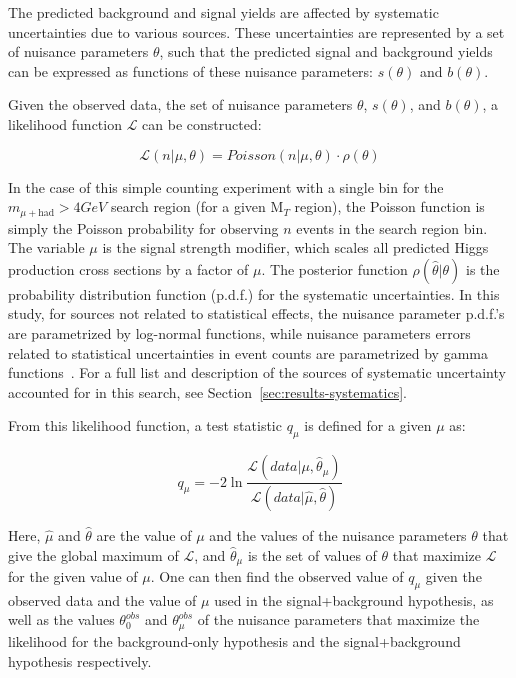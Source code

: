The predicted background and signal yields are affected by systematic uncertainties due to various sources. These uncertainties are represented by a set of nuisance parameters $\theta$, such that the predicted signal and background yields can be expressed as functions of these nuisance parameters: $s(\theta)$ and $b(\theta)$.

Given the observed data, the set of nuisance parameters $\theta$, $s(\theta)$, and $b(\theta)$, a likelihood function $\mathcal{L}$ can be constructed:

\begin{equation}
\mathcal{L}(n \vert \mu,\theta) = Poisson(n \vert \mu,\theta) \cdot \rho(\theta)
\label{eq:likelihood}
\end{equation}

In the case of this simple counting experiment with a single bin for the $m_{\mu+\text{had}} > 4 GeV$ search region (for a given M$_T$ region), the Poisson function is simply the Poisson probability for observing $n$ events in the search region bin. The variable $\mu$ is the signal strength modifier, which scales all predicted Higgs production cross sections by a factor of $\mu$. The posterior function $\rho(\hat{\theta} \vert \theta)$ is the probability distribution function (p.d.f.) for the systematic uncertainties. In this study, for sources not related to statistical effects, the nuisance parameter p.d.f.'s are parametrized by log-normal functions, while nuisance parameters errors related to statistical uncertainties in event counts are parametrized by gamma functions~\cite{CombinedTwiki}. For a full list and description of the sources of systematic uncertainty accounted for in this search, see Section~\ref{sec:results-systematics}.

From this likelihood function, a test statistic $q_{\mu}$ is defined for a given $\mu$ as:

\begin{equation}
q_{\mu} = -2\ln\frac{\mathcal{L}(data \vert \mu,\hat{\theta}_{\mu})}{\mathcal{L}(data \vert \hat{\mu},\hat{\theta})}
\label{eq:test-statistic}
\end{equation}

Here, $\hat{\mu}$ and $\hat{\theta}$ are the value of $\mu$ and the values of the nuisance parameters $\theta$ that give the global maximum of $\mathcal{L}$, and $\hat{\theta}_{\mu}$ is the set of values of $\theta$ that maximize $\mathcal{L}$ for the given value of $\mu$. One can then find the observed value of $q_{\mu}$ given the observed data and the value of $\mu$ used in the signal+background hypothesis, as well as the values $\theta^{obs}_{0}$ and $\theta^{obs}_{\mu}$ of the nuisance parameters that maximize the likelihood for the background-only hypothesis and the signal+background hypothesis respectively.

